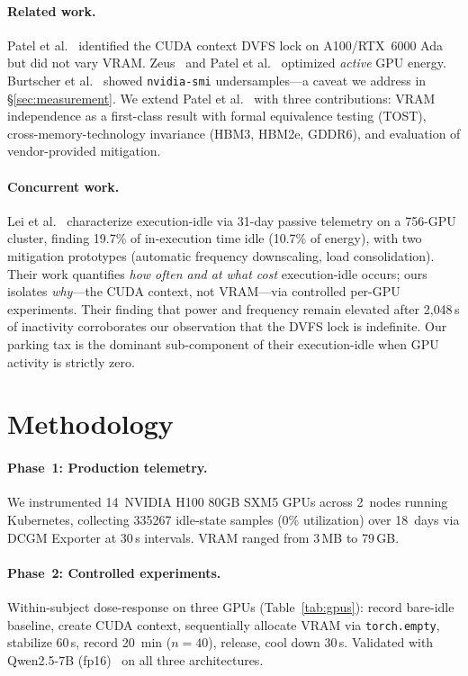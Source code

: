 \documentclass[sigconf,nonacm]{acmart}
\begin{document}
\paragraph{Related work.} Patel et al.~\cite{patel-cal23} identified the CUDA context DVFS lock on A100/RTX~6000 Ada but did not vary VRAM. Zeus~\cite{zeus} and Patel et al.~\cite{patel-asplos24} optimized \emph{active} GPU energy. Burtscher et al.~\cite{burtscher-power} showed \texttt{nvidia-smi} undersamples---a caveat we address in \S\ref{sec:measurement}. We extend Patel et al.~\cite{patel-cal23} with three contributions: VRAM independence as a first-class result with formal equivalence testing (TOST), cross-memory-technology invariance (HBM3, HBM2e, GDDR6), and evaluation of vendor-provided mitigation.

\paragraph{Concurrent work.} Lei et al.~\cite{lei-idle} characterize execution-idle via 31-day passive telemetry on a 756-GPU cluster, finding 19.7\% of in-execution time idle (10.7\% of energy), with two mitigation prototypes (automatic frequency downscaling, load consolidation). Their work quantifies \emph{how often and at what cost} execution-idle occurs; ours isolates \emph{why}---the CUDA context, not VRAM---via controlled per-GPU experiments. Their finding that power and frequency remain elevated after 2{,}048\,s of inactivity corroborates our observation that the DVFS lock is indefinite. Our parking tax is the dominant sub-component of their execution-idle when GPU activity is strictly zero.

\section{Methodology}

\paragraph{Phase~1: Production telemetry.} We instrumented 14~NVIDIA H100 80GB SXM5 GPUs across 2~nodes running Kubernetes, collecting \num{335267} idle-state samples (0\% utilization) over 18~days via DCGM Exporter at 30\,s intervals. VRAM ranged from 3\,MB to 79\,GB.

\paragraph{Phase~2: Controlled experiments.} Within-subject dose-response on three GPUs (Table~\ref{tab:gpus}): record bare-idle baseline, create CUDA context, sequentially allocate VRAM via \texttt{torch.empty}, stabilize 60\,s, record 20~min ($n=40$), release, cool down 30\,s. Validated with Qwen2.5-7B (fp16)~\cite{qwen2} on all three architectures.
\end{document}
